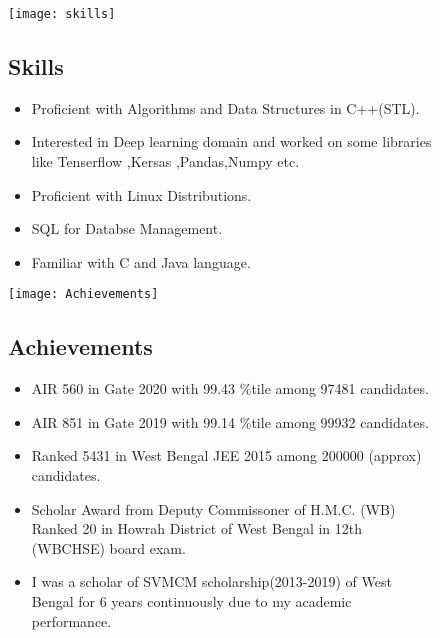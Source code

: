 \documentclass[12pt]{article}
\begin{document}
\begin{figure}[!hbt]
	
	\begin{minipage}{1\textwidth}
		\vspace*{-0.0in}
		\texttt{[image: skills]}
		\vspace{-0.25in}
		\subsection*{Skills}
		\begin{itemize}
			\item
			Proficient with Algorithms and Data Structures in C++(STL).
			\item
			Interested in Deep learning domain and worked on some libraries like Tenserflow ,Kersas ,Pandas,Numpy etc.
			\item
			Proficient with Linux Distributions. 
			\item
			SQL for Databse Management. 
			\item
			Familiar with C and Java language.
		\end{itemize}
	\end{minipage}
\end{figure}
\hrulefill
\begin{figure}[!htb]
\begin{minipage}{1\textwidth}
		\vspace*{-0.0in}
	\texttt{[image: Achievements]}
	\vspace{-0.2in}
	\subsection*{Achievements}
	
	\begin{itemize}
		\item
		AIR 560 in Gate 2020 with 99.43 \%tile among 97481 candidates.
		\item
		AIR 851 in Gate 2019 with 99.14 \%tile among 99932 candidates.
		\item
		Ranked 5431 in West Bengal JEE 2015 among 200000 (approx) candidates. 
		\item
		Scholar Award from Deputy Commissoner of H.M.C. (WB) Ranked 20 in Howrah District of West Bengal in 12th (WBCHSE) board exam.
		\item
		I was a scholar of SVMCM scholarship(2013-2019) of West Bengal for 6 years continuously due to my academic performance. 
	\end{itemize}
	
\end{minipage}
\end{figure}
\end{document}
